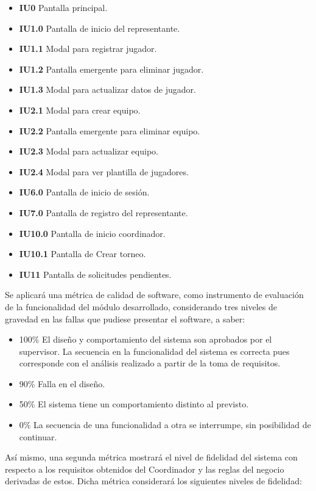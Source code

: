 \documentclass[oneside,10pt]{book}
\begin{document}
\begin{itemize}
\item \textbf{IU0} Pantalla principal.
\item \textbf{IU1.0} Pantalla de inicio del representante.
\item \textbf{IU1.1} Modal para registrar jugador.
\item \textbf{IU1.2} Pantalla emergente para eliminar jugador.
\item \textbf{IU1.3} Modal para actualizar datos de jugador.
\item \textbf{IU2.1} Modal para crear equipo.
\item \textbf{IU2.2} Pantalla emergente para eliminar equipo.
\item \textbf{IU2.3} Modal para actualizar equipo.
\item \textbf{IU2.4} Modal para ver plantilla de jugadores.
\item \textbf{IU6.0} Pantalla de inicio de sesión.
\item \textbf{IU7.0} Pantalla de registro del representante.
\item \textbf{IU10.0} Pantalla de inicio coordinador.
\item \textbf{IU10.1} Pantalla de Crear torneo.
\item \textbf{IU11} Pantalla de solicitudes pendientes.
\end{itemize}	

	Se aplicará una métrica de calidad de software, como instrumento de evaluación de la funcionalidad del módulo desarrollado, considerando tres niveles de gravedad en las fallas que pudiese presentar el software, a saber:
	
\begin{itemize}
\item 100\% El diseño y comportamiento del sistema son aprobados por el supervisor. La secuencia en la funcionalidad del sistema es correcta pues corresponde con el análisis realizado a partir de la toma de requisitos.
\item 90\% Falla en el diseño.
\item 50\% El sistema tiene un comportamiento distinto al previsto.
\item 0\% La secuencia de una funcionalidad a otra se interrumpe, sin posibilidad de continuar.
\end{itemize}

	Así mismo, una segunda métrica mostrará el nivel de fidelidad del sistema con respecto a los requisitos obtenidos del Coordinador y las reglas del negocio derivadas de estos. Dicha métrica considerará los siguientes niveles de fidelidad:
\end{document}
